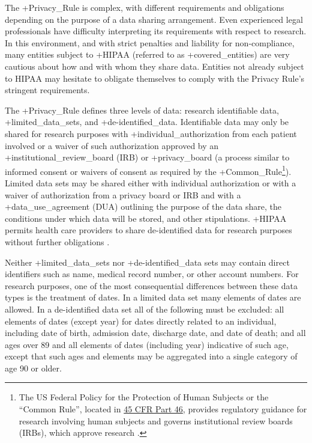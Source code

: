 \documentclass[
]{book}
\begin{document}
The +Privacy\_Rule\textbar{} is complex, with different requirements and obligations depending on the purpose of a data sharing arrangement. Even experienced legal professionals have difficulty interpreting its requirements with respect to research. In this environment, and with strict penalties and liability for non-compliance, many entities subject to +HIPAA\textbar{} (referred to as +covered\_entities\textbar) are very cautious about how and with whom they share data. Entities not already subject to HIPAA may hesitate to obligate themselves to comply with the Privacy Rule's stringent requirements.

The +Privacy\_Rule\textbar{} defines three levels of data: research identifiable data, +limited\_data\_sets\textbar, and +de-identified\_data\textbar. Identifiable data may only be shared for research purposes with +individual\_authorization\textbar{} from each patient involved or a waiver of such authorization approved by an +institutional\_review\_board\textbar{} (IRB) or +privacy\_board\textbar{} (a process similar to informed consent or waivers of consent as required by the +Common\_Rule\textbar{}\footnote{The US Federal Policy for the Protection of Human Subjects or the ``Common Rule'', located in \href{https://www.hhs.gov/ohrp/regulations-and-policy/regulations/45-cfr-46/index.html}{45 CFR Part 46}, provides regulatory guidance for research involving human subjects and governs institutional review boards (IRBs), which approve research \citep{officeforhumanresearchprotections2018a}.}). Limited data sets may be shared either with individual authorization or with a waiver of authorization from a privacy board or IRB and with a +data\_use\_agreement\textbar{} (DUA) outlining the purpose of the data share, the conditions under which data will be stored, and other stipulations. +HIPAA\textbar{} permits health care providers to share de-identified data for research purposes without further obligations \citep{u.s.departmentofhealthhumanservices2018a}.

Neither +limited\_data\_sets\textbar{} nor +de-identified\_data\textbar{} sets may contain direct identifiers such as name, medical record number, or other account numbers. For research purposes, one of the most consequential differences between these data types is the treatment of dates. In a limited data set many elements of dates are allowed. In a de-identified data set all of the following must be excluded: all elements of dates (except year) for dates directly related to an individual, including date of birth, admission date, discharge date, and date of death; and all ages over 89 and all elements of dates (including year) indicative of such age, except that such ages and elements may be aggregated into a single category of age 90 or older.
\end{document}
